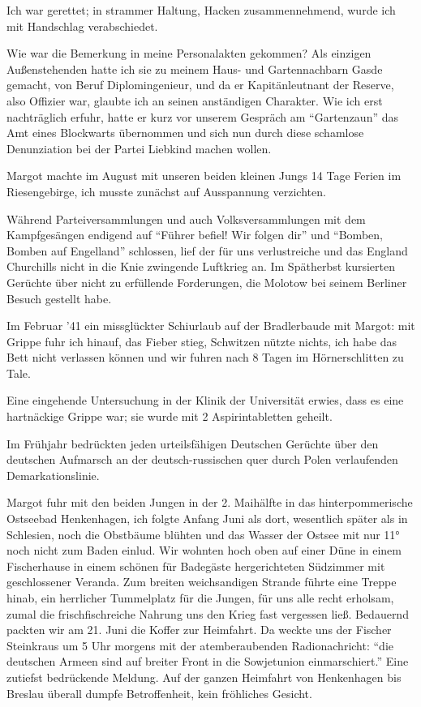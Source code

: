 \documentclass[a5paper,pagesize,10pt,twoside=true]{scrbook}
\renewcommand{\marginpar}[2][]{}
\begin{document}
Ich war gerettet; in strammer Haltung, Hacken zusammennehmend, wurde ich mit Handschlag verabschiedet.

\marginpar{27} Wie war die Bemerkung in meine Personalakten gekommen? Als einzigen Außenstehenden hatte ich sie zu meinem Haus- und Gartennachbarn Gasde gemacht, von Beruf Diplomingenieur, und da er Kapitänleutnant der Reserve, also Offizier war, glaubte ich an seinen anständigen Charakter. Wie ich erst nachträglich erfuhr, hatte er kurz vor unserem Gespräch am \enquote{Gartenzaun} das Amt eines Blockwarts übernommen und sich nun durch diese schamlose Denunziation bei der Partei Liebkind machen wollen.

Margot machte im August mit unseren beiden kleinen Jungs 14 Tage Ferien im Riesengebirge, ich musste zunächst auf Ausspannung verzichten.

Während Parteiversammlungen und auch Volksversammlungen mit dem Kampfgesängen endigend auf \enquote{Führer befiel! Wir folgen dir} und \enquote{Bomben, Bomben auf Engelland} schlossen, \marginpar{30} lief der für uns verlustreiche und das England Churchills nicht in die Knie zwingende Luftkrieg an. \marginpar{28} Im Spätherbst kursierten Gerüchte über nicht zu erfüllende Forderungen, die Molotow bei seinem Berliner Besuch gestellt habe.

Im Februar '41 ein missglückter Schiurlaub auf der Bradlerbaude mit Margot: mit Grippe fuhr ich hinauf, das Fieber stieg, Schwitzen nützte nichts, ich habe das Bett nicht verlassen können und wir fuhren nach 8 Tagen im Hörnerschlitten zu Tale.

Eine eingehende Untersuchung in der Klinik der Universität erwies, dass es eine hartnäckige Grippe war; sie wurde mit 2 Aspirintabletten geheilt.

Im Frühjahr bedrückten jeden urteilsfähigen Deutschen Gerüchte über den deutschen Aufmarsch an der deutsch-russischen quer durch Polen verlaufenden Demarkationslinie.

Margot fuhr mit den beiden Jungen in der 2. Maihälfte in das hinterpommerische Ostseebad Henkenhagen, ich folgte Anfang Juni als dort, wesentlich später als in Schlesien, \marginpar{29}noch die Obstbäume blühten und das Wasser der Ostsee mit nur 11° noch nicht zum Baden einlud. Wir wohnten hoch oben auf einer Düne in einem Fischerhause in einem schönen für Badegäste hergerichteten Südzimmer mit geschlossener Veranda. Zum breiten weichsandigen Strande führte eine Treppe hinab, ein herrlicher Tummelplatz für die Jungen, für uns alle recht erholsam, zumal die frischfischreiche Nahrung uns den Krieg fast vergessen ließ. Bedauernd packten wir am 21. Juni die Koffer zur Heimfahrt. Da weckte uns der Fischer Steinkraus um 5 Uhr morgens mit der atemberaubenden Radionachricht: \enquote{die deutschen Armeen sind auf breiter Front in die Sowjetunion einmarschiert.} Eine zutiefst bedrückende Meldung. Auf der \marginpar{30} ganzen Heimfahrt von Henkenhagen bis Breslau überall dumpfe Betroffenheit, kein fröhliches Gesicht.
\end{document}
